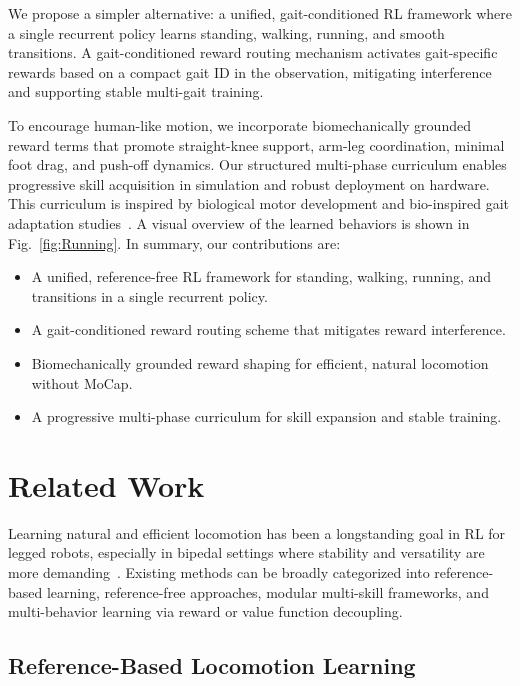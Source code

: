 \documentclass[letterpaper, 10 pt, conference]{ieeeconf}
\begin{document}
We propose a simpler alternative: a unified, gait-conditioned RL framework where a single recurrent policy learns standing, walking, running, and smooth transitions. A gait-conditioned reward routing mechanism activates gait-specific rewards based on a compact gait ID in the observation, mitigating interference and supporting stable multi-gait training.

To encourage human-like motion, we incorporate biomechanically grounded reward terms that promote straight-knee support, arm-leg coordination, minimal foot drag, and push-off dynamics. Our structured multi-phase curriculum enables progressive skill acquisition in simulation and robust deployment on hardware. This curriculum is inspired by biological motor development and bio-inspired gait adaptation studies~\cite{humphreys2024bio}. A visual overview of the learned behaviors is shown in Fig.~\ref{fig:Running}. In summary, our contributions are:
\begin{itemize}
    \item A unified, reference-free RL framework for standing, walking, running, and transitions in a single recurrent policy.
    \item A gait-conditioned reward routing scheme that mitigates reward interference.
    \item Biomechanically grounded reward shaping for efficient, natural locomotion without MoCap.
    \item A progressive multi-phase curriculum for skill expansion and stable training.
\end{itemize}

\section{Related Work}

Learning natural and efficient locomotion has been a longstanding goal in RL for legged robots, especially in bipedal settings where stability and versatility are more demanding~\cite{2025_DRL_Bipedal_review}.
 Existing methods can be broadly categorized into reference-based learning, reference-free approaches, modular multi-skill frameworks, and multi-behavior learning via reward or value function decoupling.


\subsection{Reference-Based Locomotion Learning}
\end{document}
